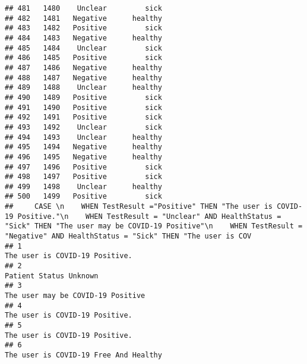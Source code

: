 \documentclass[
]{article}
\begin{document}
\begin{verbatim}
## 481   1480    Unclear         sick
## 482   1481   Negative      healthy
## 483   1482   Positive         sick
## 484   1483   Negative      healthy
## 485   1484    Unclear         sick
## 486   1485   Positive         sick
## 487   1486   Negative      healthy
## 488   1487   Negative      healthy
## 489   1488    Unclear      healthy
## 490   1489   Positive         sick
## 491   1490   Positive         sick
## 492   1491   Positive         sick
## 493   1492    Unclear         sick
## 494   1493    Unclear      healthy
## 495   1494   Negative      healthy
## 496   1495   Negative      healthy
## 497   1496   Positive         sick
## 498   1497   Positive         sick
## 499   1498    Unclear      healthy
## 500   1499   Positive         sick
##     CASE \n    WHEN TestResult ="Positive" THEN "The user is COVID-19 Positive."\n    WHEN TestResult = "Unclear" AND HealthStatus = "Sick" THEN "The user may be COVID-19 Positive"\n    WHEN TestResult = "Negative" AND HealthStatus = "Sick" THEN "The user is COV
## 1                                                                                                                                                                                                                                       The user is COVID-19 Positive.
## 2                                                                                                                                                                                                                                               Patient Status Unknown
## 3                                                                                                                                                                                                                                    The user may be COVID-19 Positive
## 4                                                                                                                                                                                                                                       The user is COVID-19 Positive.
## 5                                                                                                                                                                                                                                       The user is COVID-19 Positive.
## 6                                                                                                                                                                                                                                The user is COVID-19 Free And Healthy

\end{verbatim}
\end{document}
